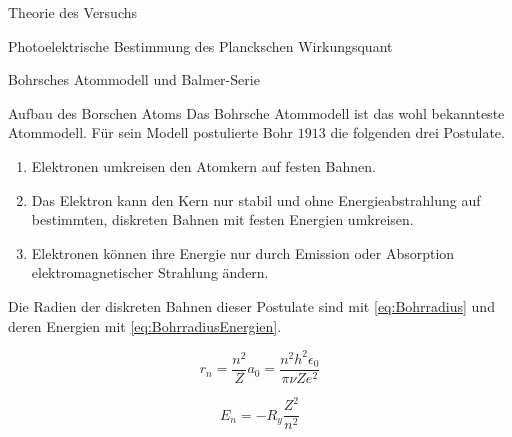 \documentclass[pdftex, a4paper,11pt, twoside, ngerman]{report}
\begin{document}
\begin{chapter}{Theorie des Versuchs}
\begin{section}{Photoelektrische Bestimmung des Planckschen Wirkungsquant}
    \end{section}
    
    
    
    \begin{section}{Bohrsches Atommodell und Balmer-Serie}
      \label{chp:TheorieBohrBalmerSerie}
      
      
      
      \begin{subsection}{Aufbau des Borschen Atoms}
        \label{chp:TheorieBohrBalmerSerieAufbauAtomhuelle}
        Das Bohrsche Atommodell ist das wohl bekannteste Atommodell. Für sein
        Modell postulierte Bohr $1913$ die folgenden drei Postulate.
        \begin{enumerate}
          \item Elektronen umkreisen den Atomkern auf festen Bahnen.
          \item Das Elektron kann den Kern nur stabil und ohne 
              Energieabstrahlung auf bestimmten, diskreten Bahnen mit festen 
              Energien umkreisen.
          \item Elektronen können ihre Energie nur durch Emission oder 
              Absorption elektromagnetischer Strahlung ändern.
        \end{enumerate}
        Die Radien der diskreten Bahnen dieser Postulate sind mit 
        \cref{eq:Bohrradius} und deren Energien mit 
        \cref{eq:BohrradiusEnergien}.
        \newline
        \begin{minipage}{.48\textwidth}
          \begin{equation}
            \label{eq:Bohrradius}
            r_{n}=\frac{n^{2}}{Z}a_{0}=\frac{n^{2}h^{2}\epsilon_{0}}
                {\pi\nu Ze^{2}}
          \end{equation}
        \end{minipage}
        \begin{minipage}{.48\textwidth}
          \begin{equation}
            \label{eq:BohrradiusEnergien}
            E_{n}=-R_{y}\frac{Z^{2}}{n^{2}}
          \end{equation}
        \end{minipage}
        

\end{subsection}
\end{section}
\end{chapter}
\end{document}
